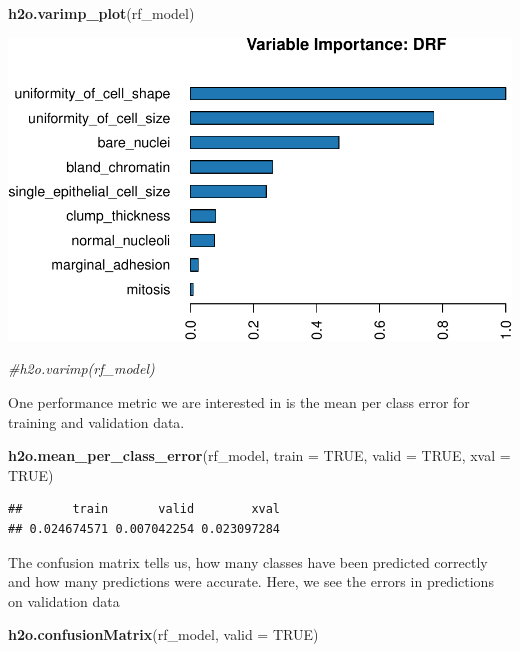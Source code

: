 \documentclass[]{article}
\newenvironment{Shaded}{\begin{snugshade}}{\end{snugshade}}
\newcommand{\KeywordTok}[1]{\textcolor[rgb]{0.13,0.29,0.53}{\textbf{{#1}}}}
\newcommand{\DataTypeTok}[1]{\textcolor[rgb]{0.13,0.29,0.53}{{#1}}}
\newcommand{\CommentTok}[1]{\textcolor[rgb]{0.56,0.35,0.01}{\textit{{#1}}}}
\newcommand{\OtherTok}[1]{\textcolor[rgb]{0.56,0.35,0.01}{{#1}}}
\newcommand{\NormalTok}[1]{{#1}}
\begin{document}
\begin{Shaded}
\begin{Highlighting}[]
\KeywordTok{h2o.varimp_plot}\NormalTok{(rf_model)}
\end{Highlighting}
\end{Shaded}

\includegraphics{webinar_code_files/figure-latex/unnamed-chunk-41-1.pdf}

\begin{Shaded}
\begin{Highlighting}[]
\CommentTok{#h2o.varimp(rf_model)}
\end{Highlighting}
\end{Shaded}

One performance metric we are interested in is the mean per class error
for training and validation data.

\begin{Shaded}
\begin{Highlighting}[]
\KeywordTok{h2o.mean_per_class_error}\NormalTok{(rf_model, }\DataTypeTok{train =} \OtherTok{TRUE}\NormalTok{, }\DataTypeTok{valid =} \OtherTok{TRUE}\NormalTok{, }\DataTypeTok{xval =} \OtherTok{TRUE}\NormalTok{)}
\end{Highlighting}
\end{Shaded}

\begin{verbatim}
##       train       valid        xval 
## 0.024674571 0.007042254 0.023097284
\end{verbatim}

The confusion matrix tells us, how many classes have been predicted
correctly and how many predictions were accurate. Here, we see the
errors in predictions on validation data

\begin{Shaded}
\begin{Highlighting}[]
\KeywordTok{h2o.confusionMatrix}\NormalTok{(rf_model, }\DataTypeTok{valid =} \OtherTok{TRUE}\NormalTok{)}
\end{Highlighting}
\end{Shaded}
\end{document}
